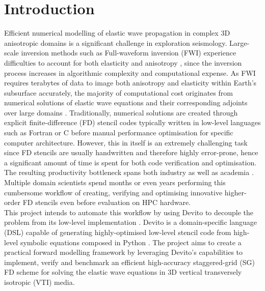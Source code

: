 \section{Introduction}
Efficient numerical modelling of elastic wave propagation in complex 3D anisotropic domains is a significant challenge in exploration seismology. Large-scale inversion methods such as Full-waveform inversion (FWI) experience difficulties to account for both elasticity and anisotropy \citep{kamath2017elastic}, since the inversion process increases in algorithmic complexity and computational expense. As FWI requires terabytes of data to image both anisotropy and elasticity within Earth's subsurface accurately, the majority of computational cost originates from numerical solutions of elastic wave equations and their corresponding adjoints over large domains \citep{witte2019large}. Traditionally, numerical solutions are created through explicit finite-difference (FD) stencil codes \citep{virieux1986p} typically written in low-level languages such as Fortran or C before manual performance optimisation for specific computer architecture. However, this in itself is an extremely challenging task since FD stencils are usually handwritten and therefore highly error-prone, hence a significant amount of time is spent for both code verification and optimisation. The resulting productivity bottleneck spans both industry as well as academia \citep{lange2016devito}. Multiple domain scientists spend months or even years \citep{louboutin2018devito} performing this cumbersome workflow of creating, verifying and optimising innovative higher-order FD stencils even before evaluation on HPC hardware.\\


This project intends to automate this workflow by using Devito to decouple the problem from its low-level implementation \citep{kukreja2016devito}. Devito is a domain-specific language (DSL) capable of generating highly-optimised low-level stencil code from high-level symbolic equations composed in Python \citep{luporini2018architecture}. The project aims to create a practical forward modelling framework by leveraging Devito's capabilities to implement, verify and benchmark an efficient high-accuracy staggered-grid (SG) \citep{bansal2008finite, tarrass2011new} FD scheme \citep{xu2019modeling} for solving the elastic wave equations in 3D vertical transversely isotropic (VTI) media.


